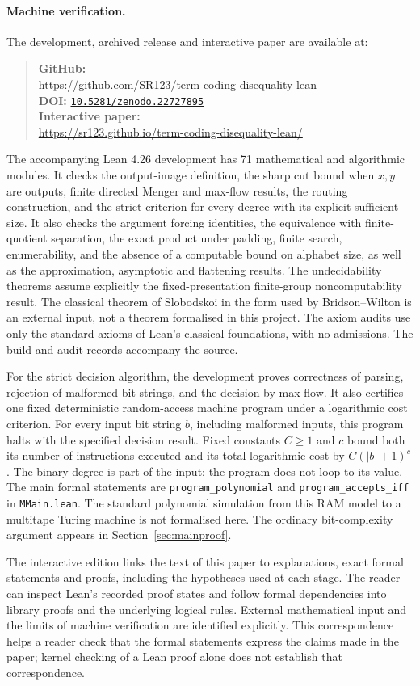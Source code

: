 \documentclass[12pt]{article}
\theoremstyle{definition}
\newcommand{\PaperThreeLeanGitHub}{\url{https://github.com/SR123/term-coding-disequality-lean}}
\newcommand{\PaperThreeLeanDOI}{\href{https://doi.org/10.5281/zenodo.22727895}{\texttt{10.5281/zenodo.22727895}}}
\newcommand{\PaperThreeInteractive}{\url{https://sr123.github.io/term-coding-disequality-lean/}}
\begin{document}
\paragraph{Machine verification.}
The development, archived release and interactive paper are available at:
\begin{quote}
\noindent\textbf{GitHub:}\\
\PaperThreeLeanGitHub\\
\textbf{DOI:} \PaperThreeLeanDOI\\
\textbf{Interactive paper:}\\
\PaperThreeInteractive
\end{quote}
The accompanying Lean 4.26 development has 71 mathematical and
algorithmic modules. It checks the output-image definition, the sharp
cut bound when $x,y$ are outputs, finite directed Menger and max-flow
results, the routing construction, and the strict criterion for every
degree with its explicit sufficient size. It also checks the argument
forcing identities, the equivalence with finite-quotient separation,
the exact product under padding, finite search, enumerability, and the
absence of a computable bound on alphabet size, as well as the
approximation, asymptotic and flattening results.
The undecidability theorems assume explicitly the fixed-presentation
finite-group noncomputability result. The classical theorem of
Slobodskoi in the form used by Bridson--Wilton is an external input,
not a theorem formalised in this project. The axiom audits use only
the standard axioms of Lean's classical foundations, with no admissions.
The build and audit records accompany the source.

For the strict decision algorithm, the development proves correctness
of parsing, rejection of malformed bit strings, and the decision by
max-flow. It also certifies one fixed deterministic random-access
machine program under a logarithmic cost criterion. For every input
bit string $b$, including malformed inputs, this program halts with
the specified decision result. Fixed constants $C\ge1$ and $c$ bound
both its number of instructions executed and its total logarithmic
cost by $C(|b|+1)^c$. The binary degree is part of the input; the
program does not loop to its value. The main formal statements are
\texttt{program\_polynomial} and \texttt{program\_accepts\_iff}
in \texttt{MMain.lean}. The standard polynomial simulation from
this RAM model to a multitape Turing machine is not formalised here.
The ordinary bit-complexity argument appears in
Section~\ref{sec:mainproof}.

The interactive edition links the text of this paper to explanations, exact formal
statements and proofs, including the hypotheses used at each stage.
The reader can inspect Lean's recorded proof states and follow formal
dependencies into library proofs and the underlying logical rules.
External mathematical input and the limits of machine verification
are identified explicitly. This correspondence helps a reader check
that the formal statements express the claims made in the paper;
kernel checking of a Lean proof alone does not establish that
correspondence.



\end{document}
